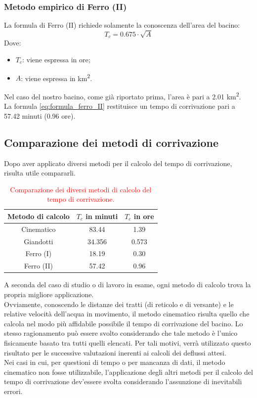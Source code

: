 \subsubsection{Metodo empirico di Ferro (II)}
La formula di Ferro (II) richiede solamente la conoscenza dell'area del bacino:
\begin{equation}
    T_c = 0.675 \cdot \sqrt{A}
    \label{eq:formula_ferro_II}
\end{equation}
Dove:
\begin{itemize}
    \item $T_c$: viene espressa in ore;
    \item $A$: viene espressa in \unit{km^2}.
\end{itemize}
Nel caso del nostro bacino, come già riportato prima, l'area è pari a 2.01 \unit{km^2}.\\
La formula \eqref{eq:formula_ferro_II} restituisce un tempo di corrivazione pari a 57.42 minuti (0.96 ore).

\subsection{Comparazione dei metodi di corrivazione}
Dopo aver applicato diversi metodi per il calcolo del tempo di corrivazione, risulta utile compararli.
\begin{table}[H] \centering
    \caption{\textcolor{red}{Comparazione dei diversi metodi di calcolo del tempo di corrivazione.}}
    \begin{tabular}{ccc}
        \toprule
  Metodo di calcolo   & $T_c$ in minuti & $T_c$ in ore\\
     \midrule
   Cinematico  & 83.44 & 1.39\\
   Giandotti  & 34.356 & 0.573\\
   Ferro (I)  & 18.19 & 0.30\\
   Ferro (II)  &57.42 & 0.96\\
     \bottomrule
    \end{tabular}
    \end{table}
A seconda del caso di studio o di lavoro in esame, ogni metodo di calcolo trova la propria migliore applicazione.\\
Ovviamente, conoscendo le distanze dei tratti (di reticolo e di versante) e le relative velocità dell'acqua in movimento, il metodo cinematico risulta quello che calcola nel modo più affidabile possibile il tempo di corrivazione del bacino. Lo stesso ragionamento può essere svolto considerando che tale metodo è l'unico fisicamente basato tra tutti quelli elencati. Per tali motivi, verrà utilizzato questo risultato per le successive valutazioni inerenti ai calcoli dei deflussi attesi.\\
Nei casi in cui, per questioni di tempo o per mancanza di dati, il metodo cinematico non fosse utilizzabile, l'applicazione degli altri metodi per il calcolo del tempo di corrivazione dev'essere svolta considerando l'assunzione di inevitabili errori. 

